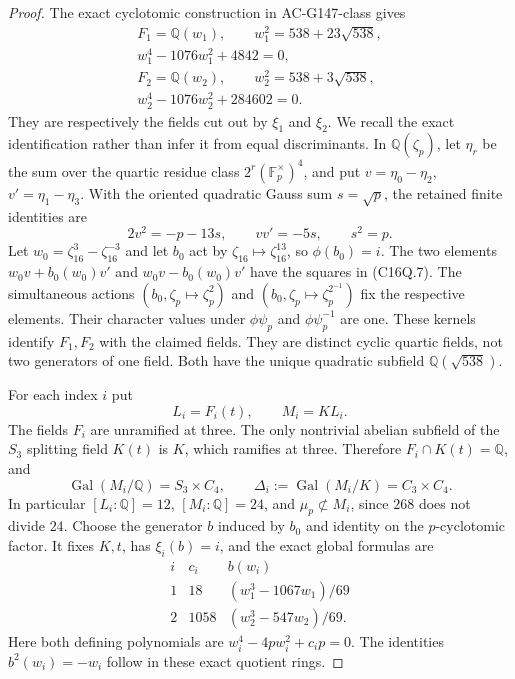 \begin{proof}
The exact cyclotomic construction in AC-G147-class gives
\[
 \begin{gathered}
 F_1=\mathbb Q(w_1),\qquad w_1^2=538+23\sqrt{538},\\
 w_1^4-1076w_1^2+4842=0,\\
 F_2=\mathbb Q(w_2),\qquad w_2^2=538+3\sqrt{538},\\
 w_2^4-1076w_2^2+284602=0.
 \end{gathered}
 \tag{C16Q.7}
\]
They are respectively the fields cut out by $\xi_1$ and $\xi_2$.
We recall the exact identification rather than infer it from
equal discriminants.
In $\mathbb Q(\zeta_p)$, let $\eta_r$ be the sum over the quartic
residue class $2^r(\mathbb F_p^\times)^4$, and put
$v=\eta_0-\eta_2$, $v'=\eta_1-\eta_3$.
With the oriented quadratic Gauss sum $s=\sqrt p$, the retained
finite identities are
\[
             2v^2=-p-13s,\qquad vv'=-5s,\qquad s^2=p.
 \tag{C16Q.8}
\]
Let $w_0=\zeta_{16}^{3}-\zeta_{16}^{-3}$ and let $b_0$ act by
$\zeta_{16}\mapsto\zeta_{16}^{13}$, so $\phi(b_0)=i$.
The two elements $w_0v+b_0(w_0)v'$ and
$w_0v-b_0(w_0)v'$ have the squares in (C16Q.7).
The simultaneous actions $(b_0,\zeta_p\mapsto\zeta_p^2)$ and
$(b_0,\zeta_p\mapsto\zeta_p^{2^{-1}})$ fix the respective elements.
Their character values under $\phi\psi_p$ and $\phi\psi_p^{-1}$
are one.  These kernels identify $F_1,F_2$ with the claimed fields.
They are distinct cyclic quartic fields, not two generators of one field.
Both have the unique quadratic subfield $\mathbb Q(\sqrt{538})$.

For each index $i$ put
\[
                    L_i=F_i(t),\qquad M_i=K L_i.
 \tag{C16Q.9}
\]
The fields $F_i$ are unramified at three.
The only nontrivial abelian subfield of the $S_3$ splitting field
$K(t)$ is $K$, which ramifies at three.
Therefore $F_i\cap K(t)=\mathbb Q$, and
\[
 \operatorname{Gal}(M_i/\mathbb Q)=S_3\times C_4,\qquad
 \Delta_i:=\operatorname{Gal}(M_i/K)=C_3\times C_4.
 \tag{C16Q.10}
\]
In particular $[L_i:\mathbb Q]=12$, $[M_i:\mathbb Q]=24$,
and $\mu_p\not\subset M_i$, since $268$ does not divide $24$.
Choose the generator $b$ induced by $b_0$ and identity on the
$p$-cyclotomic factor.  It fixes $K,t$, has $\xi_i(b)=i$, and
the exact global formulas are
\[
 \begin{array}{c|c|c}
 i&c_i& b(w_i)\\ \hline
 1&18&(w_1^3-1067w_1)/69\\
 2&1058&(w_2^3-547w_2)/69 .
 \end{array}
 \tag{C16Q.11}
\]
Here both defining polynomials are
$w_i^4-4p w_i^2+c_i p=0$.
The identities $b^2(w_i)=-w_i$ follow in these exact quotient rings.


\end{proof}
